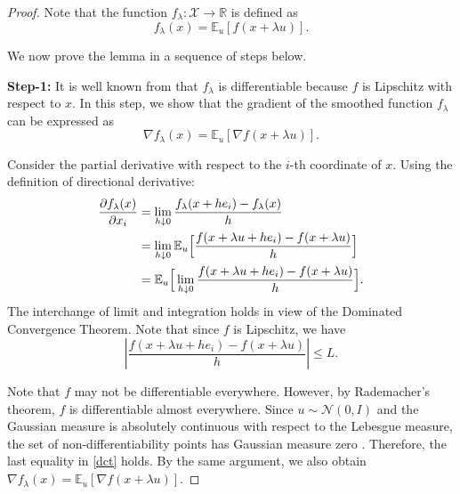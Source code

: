 \documentclass[9pt,journal,twoside,web]{ieeecolor}
\begin{document}
\begin{proof}
     Note that the function  $f_\lambda : \mathcal{X}  \to \mathbb{R}$  is defined as
    \begin{equation*}
        f_\lambda(x) = \mathbb{E}_u [f(x+ \lambda u)]. 
    \end{equation*}

  We now prove the lemma in a sequence of steps below. 
  
    \textbf{Step-1:} It is well known from \cite{Nesterov2015RandomGM} that $f_\lambda$ is differentiable because $f$ is  Lipschitz with respect to $x$.  In this step, we show that the gradient of the smoothed function $f_\lambda$
  can be expressed as
    \begin{equation*}
         \nabla f_\lambda (x)  = \mathbb{E}_u [\nabla f(x+\lambda u)].
    \end{equation*}

   Consider the partial derivative with respect to the $i$-th coordinate of $x$. Using the definition of directional derivative:
    \begin{equation}
        \begin{split}
            \frac{\partial f_\lambda (x)}{\partial x_i} & = \lim\limits_{h \downarrow 0} \frac{f_\lambda(x+h e_i )-f_\lambda(x)}{h}
            \\ & = \lim\limits_{h \downarrow 0} \mathbb{E}_u \Big{[} \frac{ f(x+\lambda u + h e_i) -f(x+\lambda u)}{h}  \Big{]}
            \\ & =\mathbb{E}_u \Big{[} \lim\limits_{h \downarrow 0} \frac{ f(x+\lambda u + h e_i) -f(x+\lambda u)}{h}  \Big{]} .
        \end{split}
        \label{dct}
    \end{equation}
    The interchange of limit and integration holds in view of the Dominated Convergence Theorem. Note that since $f$ is  Lipschitz,  we have 
    \begin{equation*}
        \left|\frac{ f(x+\lambda u + h e_i) -f(x+\lambda u)}{h}\right| \leq L.
    \end{equation*}

\color{black}
Note that $f$ may not be differentiable everywhere. However, by Rademacher’s theorem, $f$ is differentiable almost everywhere. Since $u \sim \mathcal{N}(0,I)$ and the Gaussian measure is absolutely continuous with respect to the Lebesgue measure, the set of non-differentiability points has Gaussian measure zero \cite{durrett2019probability}. Therefore, the last equality in \eqref{dct} holds. By the same argument, we also obtain
$
\nabla f_\lambda(x)=\mathbb{E}_u[\nabla f(x+\lambda u)].
$
\color{black}


\end{proof}
\end{document}
